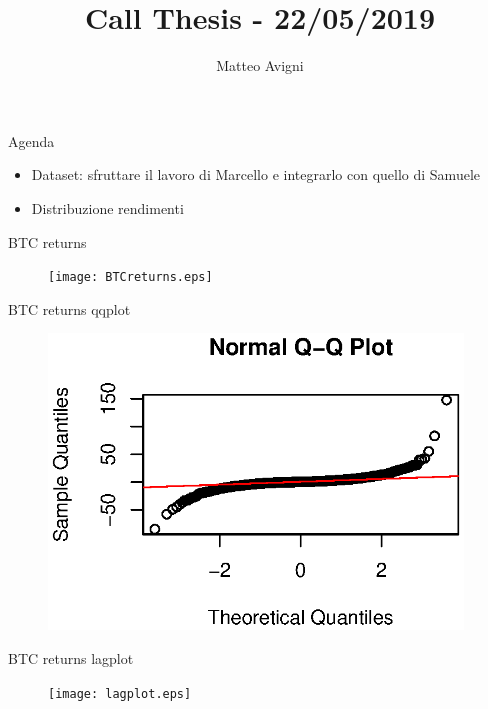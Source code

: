 \documentclass{beamer}
\title{Call Thesis - 22/05/2019}
\author{Matteo Avigni}
\begin{document}
\begin{frame}[plain]
    \maketitle
\end{frame}
\begin{frame}{Agenda}
	\begin{itemize}		
		\item Dataset: sfruttare il lavoro di Marcello e integrarlo con quello di Samuele
		\item Distribuzione rendimenti
	\end{itemize}
\end{frame}


\begin{frame}{BTC returns}
	\begin{figure}	
		\texttt{[image: BTCreturns.eps]}
	\end{figure}
\end{frame}
\begin{frame}{BTC returns qqplot}
	\begin{figure}[linewidth=250mm]	
		\includegraphics[width=110mm]{BTCqqplot.eps}
	\end{figure}
\end{frame}

\begin{frame}{BTC returns lagplot}
	\begin{figure}[linewidth=250mm]	
		\texttt{[image: lagplot.eps]}
	\end{figure}
\end{frame}
\end{document}
